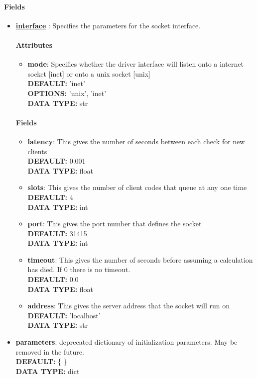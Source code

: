 \paragraph{Fields}
 \begin{itemize}
\item {\bf \hyperref[INTERFACE]{interface} }:
 Specifies the parameters for the socket interface.
\paragraph{Attributes}
 \begin{itemize}
\item {\bf mode}:
 Specifies whether the driver interface will listen onto a internet socket [inet] or onto a unix socket [unix]
{\\ \bf DEFAULT: }'inet'
{\\ \bf OPTIONS: }'unix', 'inet'
{\\ \bf DATA TYPE: }str
\end{itemize}
 
\paragraph{Fields}
 \begin{itemize}
\item {\bf latency}:
 This gives the number of seconds between each check for new clients
{\\ \bf DEFAULT: }0.001
{\\ \bf DATA TYPE: }float
\item {\bf slots}:
 This gives the number of client codes that queue at any one time
{\\ \bf DEFAULT: }4
{\\ \bf DATA TYPE: }int
\item {\bf port}:
 This gives the port number that defines the socket
{\\ \bf DEFAULT: }31415
{\\ \bf DATA TYPE: }int
\item {\bf timeout}:
 This gives the number of seconds before assuming a calculation has died. If 0 there is no timeout.
{\\ \bf DEFAULT: }0.0
{\\ \bf DATA TYPE: }float
\item {\bf address}:
 This gives the server address that the socket will run on
{\\ \bf DEFAULT: }'localhost'
{\\ \bf DATA TYPE: }str
\end{itemize}
 
\item {\bf parameters}:
 deprecated dictionary of initialization parameters. May be removed in the future.
{\\ \bf DEFAULT: }\{ \}
{\\ \bf DATA TYPE: }dict
\end{itemize}
 
